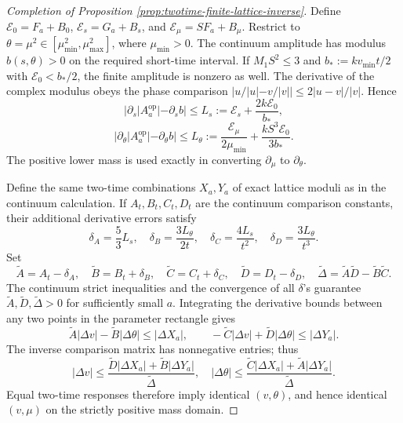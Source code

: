 \documentclass[11pt]{article}
\theoremstyle{definition}
\begin{document}
\begin{proof}[Completion of Proposition \ref{prop:twotime-finite-lattice-inverse}]
Define $\mathcal E_0=F_a+B_0$, $\mathcal E_s=G_a+B_s$, and
$\mathcal E_\mu=SF_a+B_\mu$. Restrict to
$\theta=\mu^2\in[\mu_{\min}^2,\mu_{\max}^2]$,
where $\mu_{\min}>0$.
The continuum amplitude has modulus $b(s,\theta)>0$ on the required
short-time interval. If $M_1S^2\le3$ and
$b_*:=kv_{\min}t/2$ with $\mathcal E_0<b_*/2$, the finite amplitude
is nonzero as well.
The derivative of the complex modulus obeys the phase comparison
$|u/|u|-v/|v||\le2|u-v|/|v|$. Hence
\[
 |\partial_s|A_a^{\mathrm{op}}|-\partial_s b|
 \le L_s:=\mathcal E_s+\frac{2k\mathcal E_0}{b_*},
\]
\[
 |\partial_\theta|A_a^{\mathrm{op}}|-\partial_\theta b|
 \le L_\theta:=\frac{\mathcal E_\mu}{2\mu_{\min}}
 +\frac{kS^3\mathcal E_0}{3b_*}.
\]
The positive lower mass is used exactly in converting
$\partial_\mu$ to $\partial_\theta$.

Define the same two-time combinations $X_a,Y_a$ of exact lattice moduli
as in the continuum calculation. If $A_t,B_t,C_t,D_t$ are the continuum
comparison constants, their additional derivative errors satisfy
\[
 \delta_A=\frac53L_s,\quad
 \delta_B=\frac{3L_\theta}{2t},\quad
 \delta_C=\frac{4L_s}{t^2},\quad
 \delta_D=\frac{3L_\theta}{t^3}.
\]
Set
\[
 \widetilde A=A_t-\delta_A,\quad
 \widetilde B=B_t+\delta_B,\quad
 \widetilde C=C_t+\delta_C,\quad
 \widetilde D=D_t-\delta_D,\quad
 \widetilde\Delta=\widetilde A\widetilde D-
 \widetilde B\widetilde C.
\]
The continuum strict inequalities and the convergence of all $\delta$'s
guarantee $\widetilde A,\widetilde D,\widetilde\Delta>0$ for
sufficiently small $a$. Integrating the derivative bounds between any
two points in the parameter rectangle gives
\[
 \widetilde A|\Delta v|-\widetilde B|\Delta\theta|
 \le|\Delta X_a|,\qquad
 -\widetilde C|\Delta v|+\widetilde D|\Delta\theta|
 \le|\Delta Y_a|.
\]
The inverse comparison matrix has nonnegative entries; thus
\[
 |\Delta v|\le\frac{\widetilde D|\Delta X_a|+
 \widetilde B|\Delta Y_a|}{\widetilde\Delta},\quad
 |\Delta\theta|\le\frac{\widetilde C|\Delta X_a|+
 \widetilde A|\Delta Y_a|}{\widetilde\Delta}.
\]
Equal two-time responses therefore imply identical $(v,\theta)$, and
hence identical $(v,\mu)$ on the strictly positive mass domain.
\end{proof}
\end{document}

